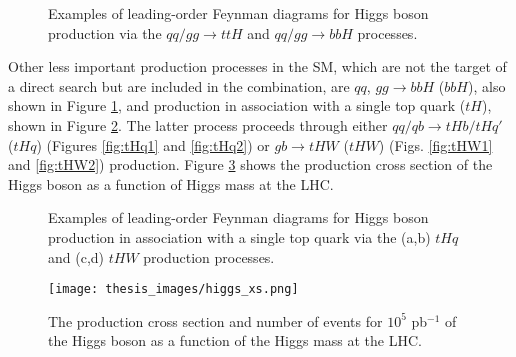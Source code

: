 \documentclass[a4paper, oneside, 11pt, openright]{book}
\begin{document}
 			\begin{figure}
 				\centering
 				\hspace{.2cm}
 				\hspace{.2cm}				
 				\caption{Examples of leading-order Feynman diagrams for Higgs boson production via the $qq/gg\to ttH$ and $qq/gg\to bbH$ processes.}
 				\label{fig:prod3}
 			\end{figure}
 			Other less important production processes in the SM, which are not the target of a direct search but are included in the combination, are $qq$, $gg\to bbH$ ($bbH$), also shown in Figure \ref{fig:prod3}, and production in association with a single top quark ($tH$), shown in Figure \ref{fig:prod4}. The latter process proceeds through either $qq/qb\to tHb/tHq'$ ($tHq$) (Figures \ref{fig:tHq1} and \ref{fig:tHq2}) or $gb\to tHW$ ($tHW$) (Figs. \ref{fig:tHW1} and \ref{fig:tHW2}) production. Figure \ref{fig:Higgs_xs} shows the production cross section of the Higgs boson as a function of Higgs mass at the	LHC.
 			\begin{figure}
 				\centering
 				\hspace{.1cm}
 				\hspace{.1cm}				
 				\hspace{.1cm}
 				\caption{Examples of leading-order Feynman diagrams for Higgs boson production in association with a single top quark via the (a,b) $tHq$ and (c,d) $tHW$ production processes.}
 				\label{fig:prod4}
 			\end{figure}
 			\begin{figure}
 				\centering
 				\texttt{[image: thesis\_images/higgs\_xs.png]}
 				\caption{The production cross section and number of events for $10^5$ pb$^{-1}$ of the Higgs boson as a function of the Higgs mass at the LHC.}
 				\label{fig:Higgs_xs}
 			\end{figure}
 	
\end{document}

